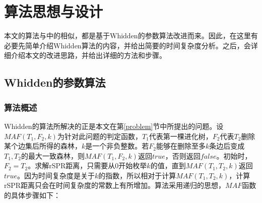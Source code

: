 
\chapter{算法思想与设计}
本文的算法与\cite{chen2012faster}中的相似，都是基于Whidden的参数算法改进而来。因此，在这里有必要先简单介绍Whidden算法的内容，并给出简要的时间复杂度分析。之后，会详细介绍本文的改进思路，并给出详细的方法和步骤。

\section{Whidden的参数算法}
\subsection{算法概述}

Whidden的算法所解决的正是本文在第\ref{problem}节中所提出的问题。设$MAF(T_1,F_2,k)$为针对此问题的判定函数，$T_1$代表第一棵进化树，$F_2$代表$T_2$删除某个边集后所得的森林，$k$是一个非负整数。若$F_2$能够在删除至多$k$条边后变成$T_1,T_2$的最大一致森林，则$MAF(T_1,F_2,k)$返回$true$，否则返回$false$。初始时，$F_2 = T_2$。求解rSPR距离，只需要从$0$开始枚举$k$的值，直到$MAF(T_1,T_2,k)$返回$true$。因为时间复杂度是关于$k$的指数，所以相对于计算$MAF(T_1,T_2,k)$，计算rSPR距离只会在时间复杂度的常数上有所增加。算法采用递归的思想，$MAF$函数的具体步骤如下：

